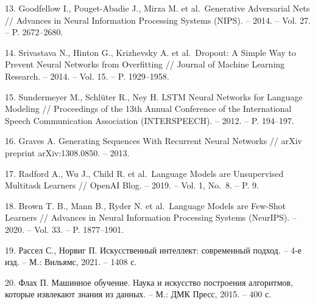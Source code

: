 13. Goodfellow I., Pouget-Abadie J., Mirza M. et al.~Generative Adversarial Nets // Advances in Neural Information Processing Systems (NIPS). -- 2014. -- Vol. 27. -- P. 2672--2680.

14. Srivastava N., Hinton G., Krizhevsky A. et al.~Dropout: A Simple Way to Prevent Neural Networks from Overfitting // Journal of Machine Learning Research. -- 2014. -- Vol. 15. -- P. 1929--1958.

15. Sundermeyer M., Schlüter R., Ney H. LSTM Neural Networks for Language Modeling // Proceedings of the 13th Annual Conference of the International Speech Communication Association (INTERSPEECH). -- 2012. -- P. 194--197.

16. Graves A. Generating Sequences With Recurrent Neural Networks // arXiv preprint arXiv:1308.0850. -- 2013.

17. Radford A., Wu J., Child R. et al.~Language Models are Unsupervised Multitask Learners // OpenAI Blog. -- 2019. -- Vol. 1, No.~8. -- P. 9.

18. Brown T. B., Mann B., Ryder N. et al.~Language Models are Few-Shot Learners // Advances in Neural Information Processing Systems (NeurIPS). -- 2020. -- Vol. 33. -- P. 1877--1901.

19. Рассел С., Норвиг П. Искусственный интеллект: современный подход. -- 4-е изд. -- М.: Вильямс, 2021. -- 1408 с.

20. Флах П. Машинное обучение. Наука и искусство построения алгоритмов, которые извлекают знания из данных. -- М.: ДМК Пресс, 2015. -- 400 с.

